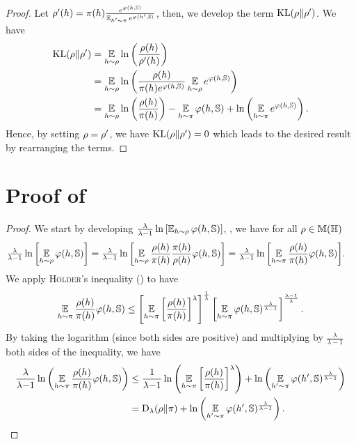 \begin{noaddcontents}
\representationKL*
\begin{proof}
Let $\rho'(h)=\pi(h)\frac{e^{\varphi(h,\mathbb{S})}}{\operatorname*{\mathbb{E}}_{h'\sim\pi}e^{\varphi(h',\mathbb{S})}}$, then, we develop the term $\operatorname{KL}(\rho\|\rho')$.
We have
\begin{align*}
    \operatorname{KL}(\rho\|\rho') &= \operatorname*{\mathbb{E}}_{h\sim\rho}\ln\left( \frac{\rho(h)}{\rho'(h)}\right)\\
    &= \operatorname*{\mathbb{E}}_{h\sim\rho}\ln\left( \frac{\rho(h)}{\pi(h)e^{\varphi(h,\mathbb{S})}}\operatorname*{\mathbb{E}}_{h\sim\rho}e^{\varphi(h,\mathbb{S})}\right)\\
    &= \operatorname*{\mathbb{E}}_{h\sim\rho}\ln\left(\frac{\rho(h)}{\pi(h)}\right) - \operatorname*{\mathbb{E}}_{h\sim\pi}\varphi(h,\mathbb{S}) + \ln\left(\operatorname*{\mathbb{E}}_{h\sim\pi}e^{\varphi(h,\mathbb{S})}\right).
\end{align*}
Hence, by setting $\rho=\rho'$, we have $\operatorname{KL}(\rho\|\rho')=0$ which leads to the desired result by rearranging the terms.
\end{proof}

\section{Proof of }
\label{ap:pac-bayes:sec:proof-general-begin}

\generalbegin*
\begin{proof}
We start by developing $\frac{\lambda}{\lambda{-}1}
   \ln \left[\operatorname*{\mathbb{E}}_{h{\sim}\rho}\varphi(h,\mathbb{S})\right]$, \ie, we have for all $\rho\in\mathbb{M}(\mathbb{H})$
\begin{align}
\tfrac{\lambda}{\lambda{-}1} \ln \left[\operatorname*{\mathbb{E}}_{h{\sim}\rho}\varphi(h,\mathbb{S})\right] 
&= \tfrac{\lambda}{\lambda{-}1} \ln\left[\operatorname*{\mathbb{E}}_{h\sim\rho}\frac{\rho(h)}{\pi(h)}\frac{\pi(h)}{\rho(h)}\varphi(h, \mathbb{S})\right] = \tfrac{\lambda}{\lambda{-}1} \ln\left[\operatorname*{\mathbb{E}}_{h\sim\pi}\frac{\rho(h)}{\pi(h)}\varphi(h, \mathbb{S})\right]\!.\label{chap:pac-bayes:eq:proof-general-begin-1}
\end{align}
We apply \textsc{Hölder}'s inequality () to have 
\begin{align*}
    \operatorname*{\mathbb{E}}_{h\sim\pi}\frac{\rho(h)}{\pi(h)}\varphi(h, \mathbb{S}) \le \left[\operatorname*{\mathbb{E}}_{h\sim\pi}\left[ \frac{\rho(h)}{\pi(h)}\right]^\lambda\right]^\frac{1}{\lambda} \left[\operatorname*{\mathbb{E}}_{h\sim\pi}\varphi(h, \mathbb{S})^{\frac{\lambda}{\lambda-1}}\right]^{\frac{\lambda-1}{\lambda}}.
\end{align*}
By taking the logarithm (since both sides are positive) and multiplying by $\frac{\lambda}{\lambda-1}$ both sides of the inequality, we have
\begin{align}
    \frac{\lambda}{\lambda{-}1}\ln\left(\operatorname*{\mathbb{E}}_{h\sim\pi}\frac{\rho(h)}{\pi(h)}\varphi(h, \mathbb{S})\right) &\le \frac{1}{\lambda{-}1}\ln\left(\operatorname*{\mathbb{E}}_{h\sim\pi}\left[ \frac{\rho(h)}{\pi(h)}\right]^\lambda\right) +  \ln\left(\operatorname*{\mathbb{E}}_{h'\sim\pi}\varphi(h', \mathbb{S})^{\frac{\lambda}{\lambda-1}}\right)\nonumber\\
    &= \operatorname{D}_{\lambda}(\rho\|\pi) + \ln\left(\operatorname*{\mathbb{E}}_{h'\sim\pi}\varphi(h', \mathbb{S})^{\frac{\lambda}{\lambda-1}}\right)\label{chap:pac-bayes:eq:proof-general-begin-2}.
\end{align}


\end{proof}
\end{noaddcontents}
